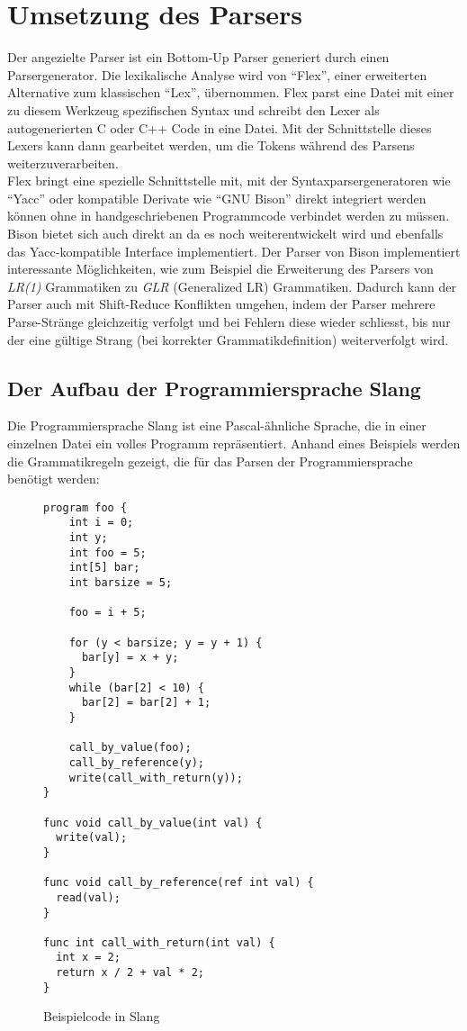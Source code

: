 \chapter{Umsetzung des Parsers}
\label{chap:building:parser}

Der angezielte Parser ist ein Bottom-Up Parser generiert durch einen Parsergenerator.
Die lexikalische Analyse wird von ``Flex'', einer erweiterten Alternative zum klassischen ``Lex'', übernommen.
Flex parst eine Datei mit einer zu diesem Werkzeug spezifischen Syntax und schreibt den Lexer als autogenerierten C oder C++ Code in eine Datei.
Mit der Schnittstelle dieses Lexers kann dann gearbeitet werden, um die Tokens während des Parsens weiterzuverarbeiten.\\
Flex bringt eine spezielle Schnittstelle mit, mit der Syntaxparsergeneratoren wie ``Yacc'' oder kompatible Derivate wie ``GNU Bison'' direkt integriert werden können ohne in handgeschriebenen Programmcode verbindet werden zu müssen\cite{flex:1995}.\\
Bison bietet sich auch direkt an da es noch weiterentwickelt wird und ebenfalls das Yacc-kompatible Interface implementiert.
Der Parser von Bison implementiert interessante Möglichkeiten, wie zum Beispiel die Erweiterung des Parsers von \textit{LR(1)} Grammatiken zu \textit{GLR} (Generalized LR) Grammatiken.
Dadurch kann der Parser auch mit Shift-Reduce Konflikten umgehen, indem der Parser mehrere Parse-Stränge gleichzeitig verfolgt und bei Fehlern diese wieder schliesst, bis nur der eine gültige Strang (bei korrekter Grammatikdefinition) weiterverfolgt wird\cite{bisonmanual}.\\

\section{Der Aufbau der Programmiersprache Slang}

Die Programmiersprache Slang ist eine Pascal-ähnliche Sprache, die in einer einzelnen Datei ein volles Programm repräsentiert.
Anhand eines Beispiels werden die Grammatikregeln gezeigt, die für das Parsen der Programmiersprache benötigt werden:

\begin{figure}[H]
  \begin{lstlisting}
program foo {
    int i = 0;
    int y;
    int foo = 5;
    int[5] bar;
    int barsize = 5;
    
    foo = i + 5;
    
    for (y < barsize; y = y + 1) {
      bar[y] = x + y;
    }
    while (bar[2] < 10) {
      bar[2] = bar[2] + 1;
    }

    call_by_value(foo);
    call_by_reference(y);
    write(call_with_return(y));
}

func void call_by_value(int val) {
  write(val);
}

func void call_by_reference(ref int val) {
  read(val);
}

func int call_with_return(int val) {
  int x = 2;
  return x / 2 + val * 2;
}
  \end{lstlisting}
  \caption{Beispielcode in Slang}
  \label{fig:slicc:slang}
\end{figure}

